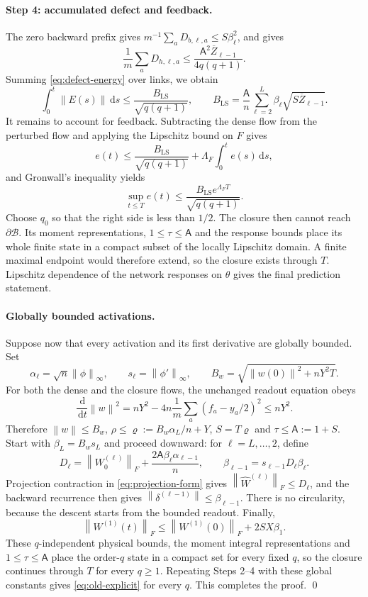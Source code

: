 \documentclass[11pt]{article}
\theoremstyle{definition}
\theoremstyle{remark}
\newcommand{\norm}[1]{\left\lVert #1\right\rVert}
\newcommand{\dd}{\,\mathrm{d}}
\begin{document}
\paragraph{Step 4: accumulated defect and feedback.}
The zero backward prefix gives $m^{-1}\sum_aD_{b,\ell,a}\le S\beta_\ell^2$, and
 gives
\[
 \frac1m\sum_aD_{h,\ell,a}
 \le\frac{\mathsf A^2\overline Z_{\ell-1}}{4q(q+1)}.
\]
Summing \eqref{eq:defect-energy} over links, we obtain
\begin{equation}
 \int_0^t\norm{E(s)}\dd s
 \le\frac{B_{\mathrm{LS}}}{\sqrt{q(q+1)}},\qquad
 B_{\mathrm{LS}}=\frac{\mathsf A}{n}
 \sum_{\ell=2}^L\beta_\ell\sqrt{S\overline Z_{\ell-1}}. \label{eq:old-defect-bound}
\end{equation}
It remains to account for feedback.  Subtracting the dense flow from the
perturbed flow and applying the Lipschitz bound on $F$ gives
\[
 e(t)\le\frac{B_{\mathrm{LS}}}{\sqrt{q(q+1)}}
 +\Lambda_F\int_0^te(s)\dd s,
\]
and Gronwall's inequality yields
\begin{equation}
 \sup_{t\le T}e(t)\le
 \frac{B_{\mathrm{LS}}e^{\Lambda_FT}}{\sqrt{q(q+1)}}.       \label{eq:old-explicit}
\end{equation}
Choose $q_0$ so that the right side is less than $1/2$.  The closure then
cannot reach $\partial\mathcal B$.  Its moment representations,
$1\le\tau\le\mathsf A$ and the response bounds place its whole finite state in a
compact subset of the locally Lipschitz domain.  A finite maximal endpoint would
therefore extend, so the closure exists through $T$.  Lipschitz dependence of
the network responses on $\theta$ gives the final prediction statement.

\paragraph{Globally bounded activations.}
Suppose now that every activation and its first derivative are globally
bounded.  Set
\[
 \alpha_\ell=\sqrt n\norm{\phi}_\infty,\qquad
 s_\ell=\norm{\phi'}_\infty,\qquad
 B_w=\sqrt{\norm{w(0)}^2+nY^2T}.
\]
For both the dense and the closure flows, the unchanged readout equation obeys
\[
 \frac{\dd}{\dd t}\norm w^2
 =nY^2-4n\frac1m\sum_a(f_a-y_a/2)^2\le nY^2.
\]
Therefore $\norm w\le B_w$, $\rho\le \varrho:=B_w\alpha_L/n+Y$, $S=T\varrho$ and
$\tau\le\mathsf A:=1+S$.  Start with $\beta_L=B_ws_L$ and proceed downward: for
$\ell=L,\ldots,2$, define
\[
 D_\ell=\norm{W_0^{(\ell)}}_F+
 \frac{2\mathsf A\beta_\ell\alpha_{\ell-1}}{n},
 \qquad \beta_{\ell-1}=s_{\ell-1}D_\ell\beta_\ell.
\]
Projection contraction in \eqref{eq:projection-form} gives
$\norm{\widehat W^{(\ell)}}_F\le D_\ell$, and the backward recurrence then gives
$\norm{\delta^{(\ell-1)}}\le\beta_{\ell-1}$.  There is no circularity, because
the descent starts from the bounded readout.  Finally,
\[
 \norm{W^{(1)}(t)}_F\le\norm{W^{(1)}(0)}_F+2SX\beta_1.
\]
These $q$-independent physical bounds, the moment integral representations and
$1\le\tau\le\mathsf A$ place the order-$q$ state in a compact set for every
fixed $q$, so the closure continues through $T$ for every $q\ge1$.  Repeating
Steps 2--4 with these global constants gives \eqref{eq:old-explicit} for every
$q$.  This completes the proof. \qed
\end{document}
